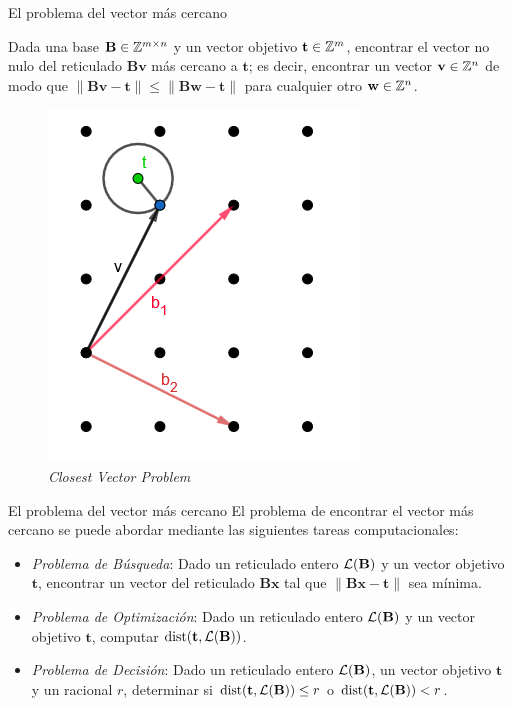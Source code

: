 \begin{frame}{El problema del vector más cercano}
\begin{definition}
Dada una base $\mathbf{B}\in \mathbb{Z}^{m\times n}$ y un vector objetivo $\mathbf{t} \in \mathbb{Z}^m$, encontrar el vector no nulo del reticulado $\mathbf{Bv}$ más cercano a $\mathbf{t}$; es decir, encontrar un vector $\mathbf{v}\in \mathbb{Z}^n$ de modo que $\|\mathbf{Bv}-\mathbf{t}\| \leq \|\mathbf{Bw}-\mathbf{t}\|$ para cualquier otro $\mathbf{w} \in \mathbb{Z}^n$.
\end{definition}
\begin{figure}
    \centering
    \includegraphics[width=0.35\linewidth]{figures/The-closest-vector-problem.png}
    \caption{\textit{Closest Vector Problem}}
    \label{fig:cvp-figure}
\end{figure}

\end{frame}

\begin{frame}{El problema del vector más cercano}
El problema de encontrar el vector más cercano se puede abordar mediante las siguientes tareas computacionales:\\
\vspace{1em}
\begin{itemize}
    \item \textit{Problema de Búsqueda}: Dado un reticulado entero $\mathcal{L}(\mathbf{B})$ y un vector objetivo $\mathbf{t}$, encontrar un vector del reticulado $\mathbf{Bx}$ tal que $\|\mathbf{Bx} - \mathbf{t}\|$ sea mínima.
    \item \textit{Problema de Optimización}: Dado un reticulado entero $\mathcal{L}(\mathbf{B})$ y un vector objetivo $\mathbf{t}$, computar $\text{dist}(\mathbf{t}, \mathcal{L}(\mathbf{B}))$.
    \item \textit{Problema de Decisión}: Dado un reticulado entero $\mathcal{L}(\mathbf{B})$, un vector objetivo $\mathbf{t}$ y un racional $r$, determinar si $\text{dist}(\mathbf{t}, \mathcal{L}(\mathbf{B})) \leq r$ o $\text{dist}(\mathbf{t}, \mathcal{L}(\mathbf{B})) < r$.
\end{itemize}
\end{frame}

